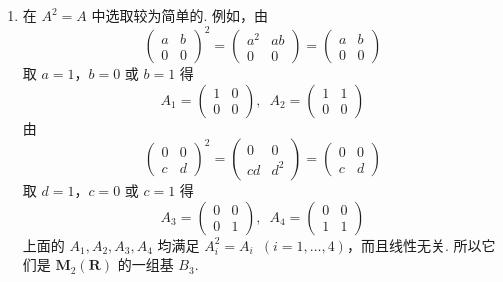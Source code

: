 \begin{exercise}
\begin{exgroup}
\begin{answer}
\begin{enumerate}
                \item 在 $ A^2 = A $ 中选取较为简单的. 例如，由
                      \[ \begin{pmatrix} a & b \\ 0 & 0 \end{pmatrix}^2 = \begin{pmatrix} a^2 & ab \\ 0 & 0 \end{pmatrix} = \begin{pmatrix} a & b \\ 0 & 0 \end{pmatrix} \]
                      取 $ a = 1 $，$ b = 0 $ 或 $ b = 1 $ 得
                      \[ A_1 = \begin{pmatrix} 1 & 0 \\ 0 & 0 \end{pmatrix},\enspace A_2 = \begin{pmatrix} 1 & 1 \\ 0 & 0 \end{pmatrix} \]
                      由
                      \[ \begin{pmatrix} 0 & 0 \\ c & d \end{pmatrix}^2 = \begin{pmatrix} 0 & 0 \\ cd & d^2 \end{pmatrix} = \begin{pmatrix} 0 & 0 \\ c & d \end{pmatrix} \]
                      取 $ d = 1 $，$ c = 0 $ 或 $ c = 1 $ 得
                      \[ A_3 = \begin{pmatrix} 0 & 0 \\ 0 & 1 \end{pmatrix},\enspace A_4 = \begin{pmatrix} 0 & 0 \\ 1 & 1 \end{pmatrix} \]
                      上面的 $ A_1, A_2, A_3, A_4 $ 均满足 $ A_i^2 = A_i \enspace(i = 1, \ldots, 4) $，而且线性无关. 所以它们是 $ \mathbf{M}_2(\mathbf{R}) $ 的一组基 $ B_3 $.


\end{enumerate}
\end{answer}
\end{exgroup}
\end{exercise}

